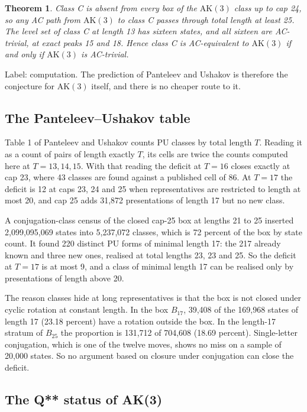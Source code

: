 \documentclass[11pt,a4paper]{article}
\newtheorem{theorem}{Theorem}[section]
\theoremstyle{definition}
\newcommand{\AK}{\mathrm{AK}}
\begin{document}
\begin{theorem}\label{thm:classC}
Class C is absent from every box of the $\AK(3)$ class up to cap 24, so any AC path from $\AK(3)$ to class C passes through total length at least 25. The level set of class C at length 13 has sixteen states, and all sixteen are AC-trivial, at exact peaks 15 and 18. Hence class C is AC-equivalent to $\AK(3)$ if and only if $\AK(3)$ is AC-trivial.
\end{theorem}

Label: computation. The prediction of Panteleev and Ushakov is therefore the conjecture for $\AK(3)$ itself, and there is no cheaper route to it.

\subsection{The Panteleev--Ushakov table}

Table 1 of Panteleev and Ushakov \cite{PU19} counts PU classes by total length $T$. Reading it as a count of pairs of length exactly $T$, its cells are twice the counts computed here at $T=13,14,15$. With that reading the deficit at $T=16$ closes exactly at cap 23, where 43 classes are found against a published cell of 86. At $T=17$ the deficit is 12 at caps 23, 24 and 25 when representatives are restricted to length at most 20, and cap 25 adds 31,872 presentations of length 17 but no new class.

A conjugation-class census of the closed cap-25 box at lengths 21 to 25 inserted 2,099,095,069 states into 5,237,072 classes, which is 72 percent of the box by state count. It found 220 distinct PU forms of minimal length 17: the 217 already known and three new ones, realised at total lengths 23, 23 and 25. So the deficit at $T=17$ is at most 9, and a class of minimal length 17 can be realised only by presentations of length above 20.

The reason classes hide at long representatives is that the box is not closed under cyclic rotation at constant length. In the box $B_{17}$, 39,408 of the 169,968 states of length 17 (23.18 percent) have a rotation outside the box. In the length-17 stratum of $B_{25}$ the proportion is 131,712 of 704,608 (18.69 percent). Single-letter conjugation, which is one of the twelve moves, shows no miss on a sample of 20,000 states. So no argument based on closure under conjugation can close the deficit.

\subsection{The Q** status of AK(3)}
\end{document}
